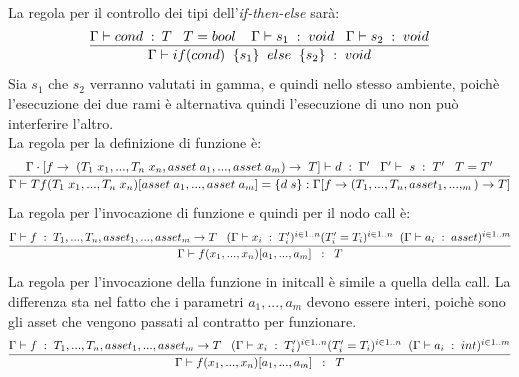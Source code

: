 \documentclass[12pt, a4paper]{report}
\begin{document}
La regola per il controllo dei tipi dell'\emph{if-then-else} sarà:
\[
    \infer{\Gamma \vdash if (cond)\;\; \{s_1\} \;\;else\;\; \{s_2\} \; : \; void}{\Gamma \vdash cond \;:\:T\;\;\; T=bool\;\;\;\; \Gamma\vdash s_1 \;:\;void\;\;\; \Gamma\vdash s_2\;: \;void}
    \]
Sia $s_1$ che $s_2$ verranno valutati in gamma, e quindi nello stesso ambiente, poichè l'esecuzione dei due rami è alternativa quindi l'esecuzione di uno non può interferire l'altro.\\
La regola per la definizione di funzione è:
\[
    \infer{\Gamma \vdash T f(T_1\;x_1,...,T_n\;x_n)[asset\;a_1,...,asset\;a_m] = \{d\;s\}:\Gamma[f\rightarrow(T_1,...,T_n,asset_1,...,_m)\rightarrow T]}
    {\Gamma\cdot[f\rightarrow\;(T_1\;x_1,...,T_n\;x_n,asset\;a_1,...,asset\;a_m)\rightarrow\;T] \vdash d\;:\;\Gamma' \;\;\; \Gamma'\vdash\;s\;:\; T'\;\;\; T=T' }
    \]
La regola per l'invocazione di funzione e quindi per il nodo call è:
\[
\infer{\Gamma\vdash f(x_1,...,x_n)[a_1,...,a_m] \;\;:\;\; T}{\Gamma \vdash f\;:\;T_1,...,T_n,asset_1,...,asset_m \rightarrow T\;\;\;(\Gamma \vdash x_i\;:\; T_i')^{i\in 1..n} (T_i' = T_i)^{i\in 1..n}\;\; (\Gamma \vdash a_i\;:\;asset)^{i\in 1..m}}    
\]
La regola per l'invocazione della funzione in initcall è simile a quella della call. La differenza sta nel fatto che i parametri $a_1,...,a_m$ devono essere interi, poichè sono gli asset che vengono passati al contratto per funzionare.
\[
\infer{\Gamma\vdash f(x_1,...,x_n)[a_1,...,a_m] \;\;:\;\; T}{\Gamma \vdash f\;:\;T_1,...,T_n,asset_1,...,asset_m \rightarrow T\;\;\;(\Gamma \vdash x_i\;:\; T_i')^{i\in 1..n} (T_i' = T_i)^{i\in 1..n}\;\; (\Gamma \vdash a_i\;:\;int)^{i\in 1..m}}    
\]
\end{document}
